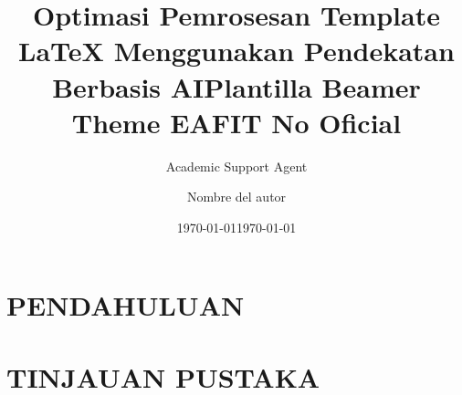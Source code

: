 \documentclass{beamer}
\title{Optimasi Pemrosesan Template LaTeX Menggunakan Pendekatan Berbasis AI}
\author{Academic Support Agent}
\date{\today}
\begin{document}
\maketitle

\begin{abstract}

\end{abstract}

\chapter{PENDAHULUAN}


\chapter{TINJAUAN PUSTAKA}






\usepackage{helvet}
\usepackage{tikz}
\usepackage{ifthen}
\usepackage[utf8]{inputenc}
\usepackage[spanish]{babel}
\usepackage{ragged2e}
\justifying
\usepackage{xcolor}
\usepackage{graphicx}
\renewcommand{\familydefault}{\sfdefault}

\author{Nombre del autor}
\title{Plantilla Beamer Theme EAFIT No Oficial}
\date{\today}
\def\eafit{Universidad EAFIT}
\def\escuela{Escuela de Ciencias }
\def\departamento{Departamento de Ciencias Matemáticas }
\def\carrera{Ingeniería Matemática}
\end{document}
